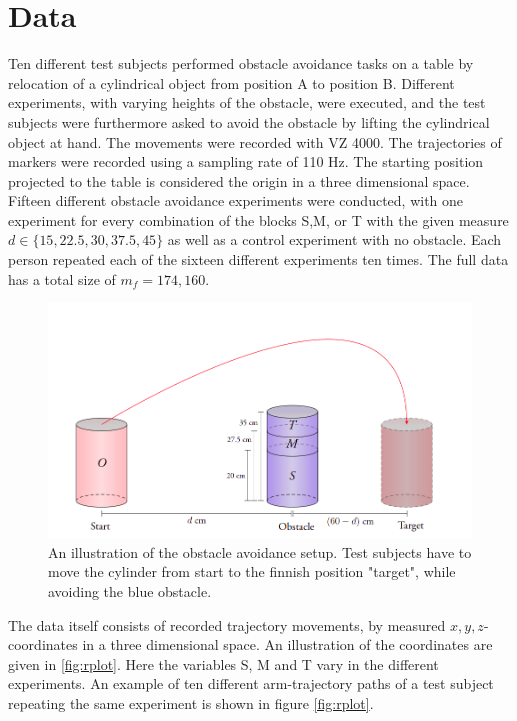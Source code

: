 \documentclass[11pt, fleqn, titlepage]{article}
\begin{document}
\section{Data}
Ten different test subjects performed obstacle avoidance tasks on a table by relocation of a cylindrical object from position A to position B. Different experiments, with varying heights of the obstacle, were executed, and the test subjects were furthermore asked to avoid the obstacle by lifting the cylindrical object at hand. The movements were recorded with VZ 4000. The trajectories of markers were recorded using a sampling rate of 110 Hz. The starting position projected to the table is considered the origin in a three dimensional space. Fifteen different obstacle avoidance experiments were conducted, with one experiment for every combination of the blocks S,M, or T with the given measure $ d \in \{15, 22.5,  30, 37.5, 45\} $ as well as a control experiment with no obstacle. Each person repeated each of the sixteen different experiments ten times. The full data has a total size of $ m_f = 174,160 $. \cite{armdata}
\begin{figure}[H]
	\centering
	\includegraphics[width=0.5\linewidth]{billeder/exp_pic.png}
	\caption{An illustration of the obstacle avoidance setup. Test subjects have to move the cylinder from start to the finnish position "target", while avoiding the blue obstacle.}
	\label{fig:exppic}
\end{figure} \noindent
The data itself consists of recorded trajectory movements, by measured $ x,y,z $-coordinates in a three dimensional space. An illustration of the coordinates are given in \ref{fig:rplot}. Here the variables S, M and T vary in the different experiments. An example of ten different arm-trajectory paths of a test subject repeating the same experiment is shown in figure \ref{fig:rplot}.
\end{document}
